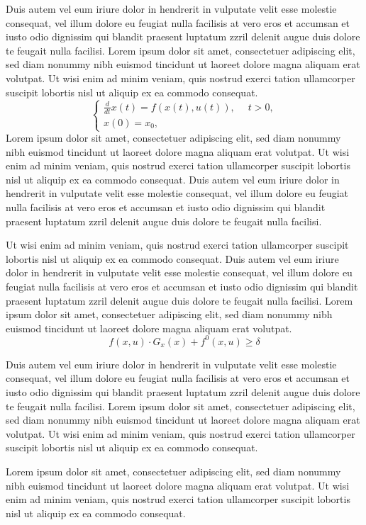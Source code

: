 \documentclass[oldfontcommands,6x9]{pupbook}
\begin{document}
Duis autem vel eum iriure dolor in hendrerit in vulputate velit esse
molestie consequat, vel illum dolore eu feugiat nulla facilisis at vero
eros et accumsan et iusto odio dignissim qui blandit praesent luptatum
zzril delenit augue duis dolore te feugait nulla facilisi. Lorem ipsum
dolor sit amet, consectetuer adipiscing elit, sed diam nonummy nibh
euismod tincidunt ut laoreet dolore magna aliquam erat volutpat. Ut wisi
enim ad minim veniam, quis nostrud exerci tation ullamcorper suscipit
lobortis nisl ut aliquip ex ea commodo consequat. 
\begin {equation} \label{eq2.1}
\left \{
\begin{array}{llr}
\frac{d}{dt}x(t)=f(x(t),u(t)),\quad \;t > 0, \\[6pt]
x(0)=x_0,
\end{array}
\right.
\end{equation}
Lorem ipsum dolor sit amet, consectetuer adipiscing elit, sed diam
nonummy nibh euismod tincidunt ut laoreet dolore magna aliquam erat
volutpat. Ut wisi enim ad minim veniam, quis nostrud exerci tation
ullamcorper suscipit lobortis nisl ut aliquip ex ea commodo consequat.
Duis autem vel eum iriure dolor in hendrerit in vulputate velit esse
molestie consequat, vel illum dolore eu feugiat nulla facilisis at vero
eros et accumsan et iusto odio dignissim qui blandit praesent luptatum
zzril delenit augue duis dolore te feugait nulla facilisi. 

Ut wisi enim ad minim veniam, quis nostrud exerci tation ullamcorper
suscipit lobortis nisl ut aliquip ex ea commodo consequat. Duis autem
vel eum iriure dolor in hendrerit in vulputate velit esse molestie
consequat, vel illum dolore eu feugiat nulla facilisis at vero eros et
accumsan et iusto odio dignissim qui blandit praesent luptatum zzril
delenit augue duis dolore te feugait nulla facilisi. Lorem ipsum dolor
sit amet, consectetuer adipiscing elit, sed diam nonummy nibh euismod
tincidunt ut laoreet dolore magna aliquam erat volutpat. 
\begin{equation} \label{eq2.9}
f(x,u) \cdot G_x (x) + f^0 (x,u) \ge \delta
\end{equation}

Duis autem vel eum iriure dolor in hendrerit in vulputate velit esse
molestie consequat, vel illum dolore eu feugiat nulla facilisis at vero
eros et accumsan et iusto odio dignissim qui blandit praesent luptatum
zzril delenit augue duis dolore te feugait nulla facilisi. Lorem ipsum
dolor sit amet, consectetuer adipiscing elit, sed diam nonummy nibh
euismod tincidunt ut laoreet dolore magna aliquam erat volutpat. Ut wisi
enim ad minim veniam, quis nostrud exerci tation ullamcorper suscipit
lobortis nisl ut aliquip ex ea commodo consequat. 
\begin{theorem}
Lorem ipsum
dolor sit amet, consectetuer adipiscing elit, sed diam nonummy nibh
euismod tincidunt ut laoreet dolore magna aliquam erat volutpat. Ut wisi
enim ad minim veniam, quis nostrud exerci tation ullamcorper suscipit
lobortis nisl ut aliquip ex ea commodo consequat. 
\end{theorem}
\end{document}
